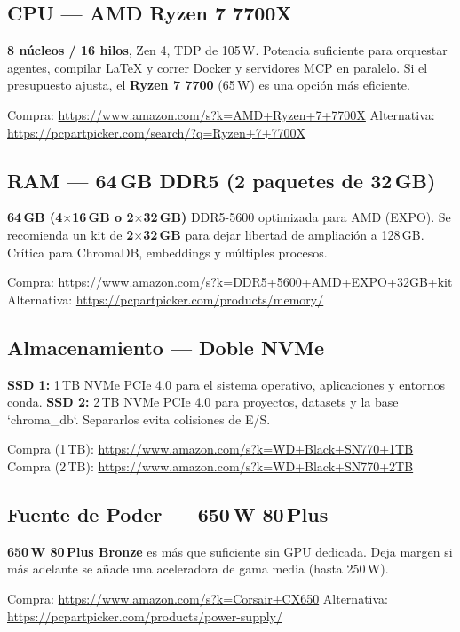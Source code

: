 \documentclass[11pt,a4paper]{article}
\begin{document}
\subsection{CPU --- AMD Ryzen 7 7700X}
\label{link-cpu}
\begin{tcolorbox}[cajaRecomendacion, title={\faIcon{microchip}~Procesador}]
\textbf{8 n\'ucleos / 16 hilos}, Zen 4, TDP de 105\,W. Potencia suficiente para orquestar agentes, compilar LaTeX y correr Docker y servidores MCP en paralelo. Si el presupuesto ajusta, el \textbf{Ryzen 7 7700} (65\,W) es una opción m\'as eficiente.

Compra: \url{https://www.amazon.com/s?k=AMD+Ryzen+7+7700X}
Alternativa: \url{https://pcpartpicker.com/search/?q=Ryzen+7+7700X}
\end{tcolorbox}

\subsection{RAM --- 64\,GB DDR5 (2 paquetes de 32\,GB)}
\label{link-ram}
\begin{tcolorbox}[cajaRecomendacion, title={\faIcon{microchip}~Memoria}]
\textbf{64\,GB (4$\times$16\,GB o 2$\times$32\,GB)} DDR5-5600 optimizada para AMD (EXPO). Se recomienda un kit de \textbf{2$\times$32\,GB} para dejar libertad de ampliación a 128\,GB. Crítica para ChromaDB, embeddings y m\'ultiples procesos.

Compra: \url{https://www.amazon.com/s?k=DDR5+5600+AMD+EXPO+32GB+kit}
Alternativa: \url{https://pcpartpicker.com/products/memory/}
\end{tcolorbox}

\subsection{Almacenamiento --- Doble NVMe}
\label{link-ssd1}\label{link-ssd2}
\begin{tcolorbox}[cajaRecomendacion, title={\faIcon{hdd}~SSD}]
\textbf{SSD 1:} 1\,TB NVMe PCIe 4.0 para el sistema operativo, aplicaciones y entornos conda. \textbf{SSD 2:} 2\,TB NVMe PCIe 4.0 para proyectos, datasets y la base `chroma\_db`. Separarlos evita colisiones de E/S.

Compra (1\,TB): \url{https://www.amazon.com/s?k=WD+Black+SN770+1TB}
Compra (2\,TB): \url{https://www.amazon.com/s?k=WD+Black+SN770+2TB}
\end{tcolorbox}

\subsection{Fuente de Poder --- 650\,W 80\,Plus}
\label{link-psu}
\begin{tcolorbox}[cajaRecomendacion, title={\faIcon{bolt}~PSU}]
\textbf{650\,W 80\,Plus Bronze} es m\'as que suficiente sin GPU dedicada. Deja margen si m\'as adelante se a\~nade una aceleradora de gama media (hasta 250\,W).

Compra: \url{https://www.amazon.com/s?k=Corsair+CX650}
Alternativa: \url{https://pcpartpicker.com/products/power-supply/}
\end{tcolorbox}
\end{document}
